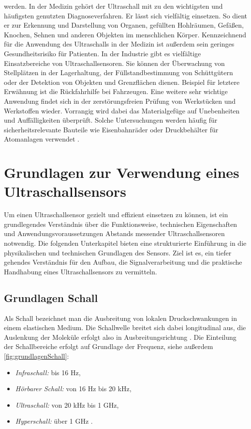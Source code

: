 werden.
In der Medizin gehört der Ultraschall mit zu den wichtigsten und häufigsten genutzten
Diagnoseverfahren. Er lässt sich vielfältig einsetzen. So dient er zur Erkennung und
Darstellung von Organen, gefüllten Hohlräumen, Gefäßen, Knochen, Sehnen und
anderen Objekten im menschlichen Körper. Kennzeichnend für die Anwendung des
Ultraschalls in der Medizin ist außerdem sein geringes Gesundheitsrisiko für Patienten.
In der Industrie gibt es vielfältige Einsatzbereiche von Ultraschallsensoren. Sie können
der Überwachung von Stellplätzen in der Lagerhaltung, der Füllstandbestimmung von
Schüttgütern \cite{Hesse:2009} oder der Detektion von Objekten und Grenzflächen dienen. Beispiel für letztere Erwähnung ist die Rückfahrhilfe bei Fahrzeugen. Eine weitere sehr wichtige
Anwendung findet sich in der zerstörungsfreien Prüfung von Werkstücken und
Werkstoffen wieder. Vorrangig wird dabei das Materialgefüge auf Unebenheiten und
Auffälligkeiten überprüft. Solche Untersuchungen werden häufig für
sicherheitsrelevante Bauteile wie Eisenbahnräder oder Druckbehälter für Atomanlagen
verwendet \cite{Muller:2017}.

\section{Grundlagen zur Verwendung eines Ultraschallsensors}
\label{grundlagen}
Um einen Ultraschallsensor gezielt und effizient einsetzen zu können, ist ein
grundlegendes Verständnis über die Funktionsweise, technischen Eigenschaften und
Anwendungsvoraussetzungen Abstands messender Ultraschallsensoren notwendig. Die
folgenden Unterkapitel bieten eine strukturierte Einführung in die physikalischen und
technischen Grundlagen des Sensors. Ziel ist es, ein tiefer gehendes Verständnis für den
Aufbau, die Signalverarbeitung und die praktische Handhabung eines Ultraschallsensors zu
vermitteln. \cite{ArduinoWeb:2025}

\subsection{Grundlagen Schall}

Als Schall bezeichnet man die Ausbreitung von lokalen Druckschwankungen in einem elastischen Medium. Die Schallwelle breitet sich dabei longitudinal aus, die Auslenkung der Moleküle erfolgt also in Ausbreitungsrichtung \cite{Tippler:2024}.
Die Einteilung der Schallbereiche erfolgt auf Grundlage der Frequenz, siehe außerdem \ref{fig:grundlagenSchall}:

\begin{itemize}
    \item \textit{Infraschall:} bis 16 Hz,
    \item \textit{Hörbarer Schall:} von 16 Hz bis 20 kHz,
    \item \textit{Ultraschall:} von 20 kHz bis 1 GHz,
    \item \textit{Hyperschall:} über 1 GHz \cite{Hering:2023}.
\end{itemize}

